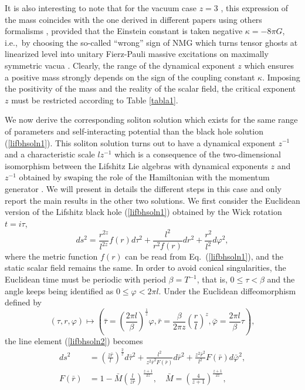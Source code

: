 \documentclass[prd,twocolumn,superscriptaddress,amsmath,amssymb,nofootinbib]{revtex4-1}
\begin{document}
It is also interesting to note that for the vacuum case $z=3$
\cite{AyonBeato:2009nh}, this expression of the mass coincides
with the one derived in different papers using others
formalisms
\cite{Cai:2009ac,Myung:2009up,Hohm:2010jc,Gonzalez:2011nz},
provided that the Einstein constant is taken negative
$\kappa=-8{\pi}G$, i.e.,\ by choosing the so-called ``wrong''
sign of NMG which turns tensor ghosts at linearized level into
unitary Fierz-Pauli massive excitations on maximally symmetric
vacua \cite{Bergshoeff:2009hq}. Clearly, the range of the
dynamical exponent $z$ which ensures a positive mass strongly
depends on the sign of the coupling constant $\kappa$. Imposing
the positivity of the mass and the reality of the scalar field,
the critical exponent $z$ must be restricted according to Table
\ref{tabla1}.

We now derive the corresponding soliton solution which exists
for the same range of parameters and self-interacting potential
than the black hole solution (\ref{lifbhsoln1}). This soliton
solution turns out to have a dynamical exponent $z^{-1}$ and a
characteristic scale $lz^{-1}$ which is a consequence of the
two-dimensional isomorphism between the Lifshitz Lie algebras
with dynamical exponents $z$ and $z^{-1}$ obtained by swaping
the role of the Hamiltonian with the momentum generator
\cite{Gonzalez:2011nz}. We will present in details the
different steps in this case and only report the main results
in the other two solutions. We first consider the Euclidean
version of the Lifshitz black hole (\ref{lifbhsoln1}) obtained
by the Wick rotation $t=i\tau$,
\begin{equation}\label{lifbhsoln2}
ds^2 = \frac{r^{2z}}{l^{2z}}f(r)d\tau^2
 + \frac{l^2}{r^2f(r)}{dr^2} + \frac{r^2}{l^2}d{\varphi}^2,
\end{equation}
where the metric function $f(r)$ can be read from
Eq.~(\ref{lifbhsoln1}), and the static scalar field remains the
same. In order to avoid conical singularities, the Euclidean
time must be periodic with period $\beta=T^{-1}$, that is,
$0\leq\tau<\beta$ and the angle keeps being identified as
$0\leq\varphi<2{\pi}l$. Under the Euclidean diffeomorphism
defined by
\begin{equation}\label{diffeo}
(\tau,r,\varphi)\mapsto\left(\bar{\tau}=\left(\frac{2\pi l}{\beta}\right)^{\frac{1}{z}}\varphi,
\bar{r}=\frac{\beta}{2\pi z}\left(\frac{r}{l}\right)^z,
\bar{\varphi}=\frac{2\pi l}{\beta}\tau\right),
\end{equation}
the line element (\ref{lifbhsoln2}) becomes
\begin{align}
ds^2&=\left(\frac{z\bar{r}}{l}\right)^{\frac{2}{z}}d\bar{\tau}^2
+\frac{l^2}{z^2\bar{r}^2 F(\bar{r})}d\bar{r}^2
+\frac{z^2 \bar{r}^2}{l^2}F(\bar{r})d\bar{\varphi}^2,\nonumber\\
F(\bar{r})&=1-\bar{M}\left(\frac{l}{z\bar{r}}\right)^{\frac{z+1}{2z}},\quad
\bar{M}=\left(\frac{4}{z+1}\right)^{\frac{z+1}{2z}},
\end{align}
\end{document}
